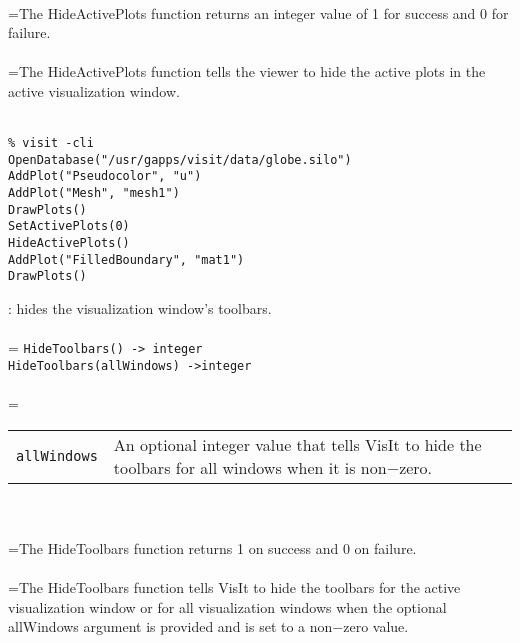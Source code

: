 \documentclass[10pt,a4paper]{report}
\begin{document}
 \\ 
\hangindent=\parindent The HideActivePlots function returns an integer value of 1 for success and 0 for failure. \\[-3mm] 

 \\ 
\hangindent=\parindent The HideActivePlots function tells the viewer to hide the active plots in the active visualization window. \\[-3mm] 

\\[-6mm]
\begin{verbatim}% visit -cli
OpenDatabase("/usr/gapps/visit/data/globe.silo")
AddPlot("Pseudocolor", "u")
AddPlot("Mesh", "mesh1")
DrawPlots()
SetActivePlots(0)
HideActivePlots()
AddPlot("FilledBoundary", "mat1")
DrawPlots()
\end{verbatim}
\newpage


{}
: hides the visualization window's toolbars.\\[-3mm]

 \\ 
\hangindent=\parindent 
\verb!HideToolbars() -> integer!\\ 
\verb!HideToolbars(allWindows) ->integer!\\ [-3mm]

 \\ 
\hangindent=\parindent 
\begin{tabular}{lp{9cm}}
\verb!allWindows! & An optional integer value that tells VisIt to hide the toolbars for all windows when it is non$-$zero. \\
\end{tabular} \\[-2mm]


 \\ 
\hangindent=\parindent The HideToolbars function returns 1 on success and 0 on failure. \\[-3mm] 

 \\ 
\hangindent=\parindent The HideToolbars function tells VisIt to hide the toolbars for the active visualization window or for all visualization windows when the optional allWindows argument is provided and is set to a non$-$zero value. \\[-3mm] 
\end{document}
